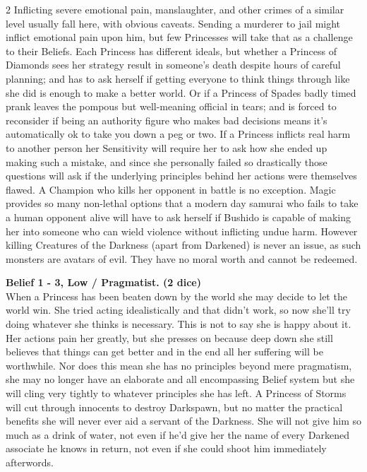 \begin{multicols}{2}
Inflicting severe emotional pain, manslaughter, and other crimes of a similar level usually fall here, with obvious caveats. Sending a murderer to jail might inflict emotional pain upon him, but few Princesses will take that as a challenge to their Beliefs. Each Princess has different ideals, but whether a Princess of Diamonds sees her strategy result in someone's death despite hours of careful planning; and has to ask herself if getting everyone to think things through like she did is enough to make a better world. Or if a Princess of Spades badly timed prank leaves the pompous but well-meaning official in tears; and is forced to reconsider if being an authority figure who makes bad decisions means it's automatically ok to take you down a peg or two. If a Princess inflicts real harm to another person her Sensitivity will require her to ask how she ended up making such a mistake, and since she personally failed so drastically those questions will ask if the underlying principles behind her actions were themselves flawed. A Champion who kills her opponent in battle is no exception. Magic provides so many non-lethal options that a modern day samurai who fails to take a human opponent alive will have to ask herself if Bushido is capable of making her into someone who can wield violence without inflicting undue harm. However killing Creatures of the Darkness (apart from Darkened) is never an issue, as such monsters are avatars of evil. They have no moral worth and cannot be redeemed. 

\noindent\textbf{Belief 1 - 3, Low / Pragmatist. (2 dice)}\\

\noindent When a Princess has been beaten down by the world she may decide to let the world win. She tried acting idealistically and that didn't work, so now she'll try doing whatever she thinks is necessary. This is not to say she is happy about it. Her actions pain her greatly, but she presses on because deep down she still believes that things can get better and in the end all her suffering will be worthwhile. Nor does this mean she has no principles beyond mere pragmatism, she may no longer have an elaborate and all encompassing Belief system but she will cling very tightly to whatever principles she has left. A Princess of Storms will cut through innocents to destroy Darkspawn, but no matter the practical benefits she will never ever aid a servant of the Darkness. She will not give him so much as a drink of water, not even if he'd give her the name of every Darkened associate he knows in return, not even if she could shoot him immediately afterwords. 


\end{multicols}

